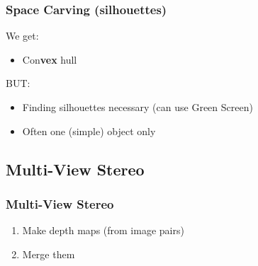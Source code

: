 \documentclass{beamer}
\begin{document}
\begin{frame}
  \frametitle{Space Carving (silhouettes)}
  We get:
  \begin{itemize}
    \item Con\textbf{vex} hull
  \end{itemize}
  BUT:
  \begin{itemize}
    \item Finding silhouettes necessary (can use Green Screen)
    \item Often one (simple) object only
  \end{itemize}
\end{frame}


\subsection*{Multi-View Stereo}

\begin{frame}
  \frametitle{Multi-View Stereo}
  \begin{enumerate}
    \item Make depth maps (from image pairs)
    \item Merge them
  \end{enumerate}
\end{frame}
\end{document}
